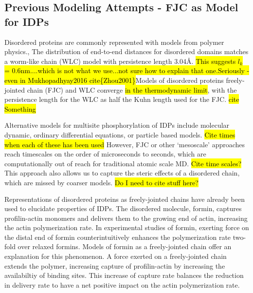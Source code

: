 \documentclass[../AdvancementSummary.tex]{subfiles}
\begin{document}
\subsection{Previous Modeling Attempts - FJC as Model for IDPs}

Disordered proteins are commonly represented with models from polymer physics.\cite{VanValen2009},\cite{Reeves2011} The distribution of end-to-end distances for disordered domains matches a worm-like chain (WLC) model with persistence length 3.04\AA . \hl{This suggests $l_k$ = 0.6nm....which is not what we use...not sure how to explain that one.}\hl{Seriously - even in Mukhopadhyay2016 cite\{Zhou2001\}}Models of disordered proteins freely-jointed chain (FJC) and WLC converge \hl{in the thermodynamic limit}, with the persistence length for the WLC as half the Kuhn length used for the FJC. \hl{cite Something} 


Alternative models for multisite phosphorylation of IDPs include molecular dynamic, ordinary differential equations, or particle based models.  \hl{Cite times when each of these has been used} However, FJC or other `mesoscale' approaches reach timescales on the order of microseconds to seconds, which are computationally out of reach for traditional atomic scale MD. \hl{Cite time scales?} This approach also allows us to capture the steric effects of a disordered chain, which are missed by coarser models. \hl{Do I need to cite stuff here?}

Representations of disordered proteins as freely-jointed chains have already been used to elucidate properties of IDPs. The disordered molecule, formin, captures profilin-actin monomers and delivers them to the growing end of actin, increasing the actin polymerization rate. In experimental studies of formin, exerting force on the distal end of formin counterintuitively enhances the polymerization rate two-fold over relaxed formins. \cite{Jegou2013} Models of formin as a freely-jointed chain offer an explanation for this phenomenon. A force exerted on a freely-jointed chain extends the polymer, increasing capture of profilin-actin by increasing the availabiltiy of binding sites. This increase of capture rate balances the reduction in delivery rate to have a net positive impact on the actin polymerization rate. \cite{Bryant2017}
\end{document}
